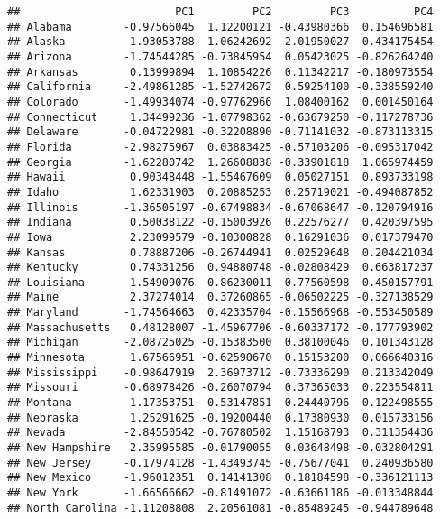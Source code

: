 \documentclass[]{article}
\newenvironment{Shaded}{\begin{snugshade}}{\end{snugshade}}
\newcommand{\OperatorTok}[1]{\textcolor[rgb]{0.81,0.36,0.00}{\textbf{#1}}}
\newcommand{\NormalTok}[1]{#1}
\begin{document}
\begin{Shaded}
\end{Shaded}

\begin{verbatim}
##                        PC1         PC2         PC3          PC4
## Alabama        -0.97566045  1.12200121 -0.43980366  0.154696581
## Alaska         -1.93053788  1.06242692  2.01950027 -0.434175454
## Arizona        -1.74544285 -0.73845954  0.05423025 -0.826264240
## Arkansas        0.13999894  1.10854226  0.11342217 -0.180973554
## California     -2.49861285 -1.52742672  0.59254100 -0.338559240
## Colorado       -1.49934074 -0.97762966  1.08400162  0.001450164
## Connecticut     1.34499236 -1.07798362 -0.63679250 -0.117278736
## Delaware       -0.04722981 -0.32208890 -0.71141032 -0.873113315
## Florida        -2.98275967  0.03883425 -0.57103206 -0.095317042
## Georgia        -1.62280742  1.26608838 -0.33901818  1.065974459
## Hawaii          0.90348448 -1.55467609  0.05027151  0.893733198
## Idaho           1.62331903  0.20885253  0.25719021 -0.494087852
## Illinois       -1.36505197 -0.67498834 -0.67068647 -0.120794916
## Indiana         0.50038122 -0.15003926  0.22576277  0.420397595
## Iowa            2.23099579 -0.10300828  0.16291036  0.017379470
## Kansas          0.78887206 -0.26744941  0.02529648  0.204421034
## Kentucky        0.74331256  0.94880748 -0.02808429  0.663817237
## Louisiana      -1.54909076  0.86230011 -0.77560598  0.450157791
## Maine           2.37274014  0.37260865 -0.06502225 -0.327138529
## Maryland       -1.74564663  0.42335704 -0.15566968 -0.553450589
## Massachusetts   0.48128007 -1.45967706 -0.60337172 -0.177793902
## Michigan       -2.08725025 -0.15383500  0.38100046  0.101343128
## Minnesota       1.67566951 -0.62590670  0.15153200  0.066640316
## Mississippi    -0.98647919  2.36973712 -0.73336290  0.213342049
## Missouri       -0.68978426 -0.26070794  0.37365033  0.223554811
## Montana         1.17353751  0.53147851  0.24440796  0.122498555
## Nebraska        1.25291625 -0.19200440  0.17380930  0.015733156
## Nevada         -2.84550542 -0.76780502  1.15168793  0.311354436
## New Hampshire   2.35995585 -0.01790055  0.03648498 -0.032804291
## New Jersey     -0.17974128 -1.43493745 -0.75677041  0.240936580
## New Mexico     -1.96012351  0.14141308  0.18184598 -0.336121113
## New York       -1.66566662 -0.81491072 -0.63661186 -0.013348844
## North Carolina -1.11208808  2.20561081 -0.85489245 -0.944789648

\end{verbatim}
\end{document}
